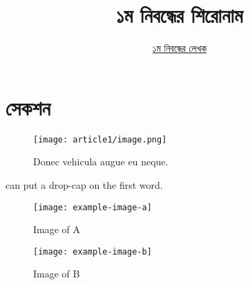 \documentclass[12pt]{article}
\begin{document}

\title{১ম নিবন্ধের শিরোনাম}
\author{\href{https://github.com/rafisics/ebook-template}{১ম নিবন্ধের লেখক}}
\date{}


\section{সেকশন}

\begin{figure}[htbp]
        \centering
        \texttt{[image: article1/image.png]}
        \caption{Donec vehicula augue eu neque.}
\end{figure}

 can put a drop-cap on the first word.
\blindtext

\begin{figure}[htb]
    \centering
    \begin{minipage}[t]{0.5\textwidth}
        \centering
        \texttt{[image: example-image-a]}
        \caption{Image of A}
    \end{minipage}%
    \begin{minipage}[t]{0.5\textwidth}
        \centering
        \texttt{[image: example-image-b]}
        \caption{Image of B}
    \end{minipage}
\end{figure}

\end{document}

